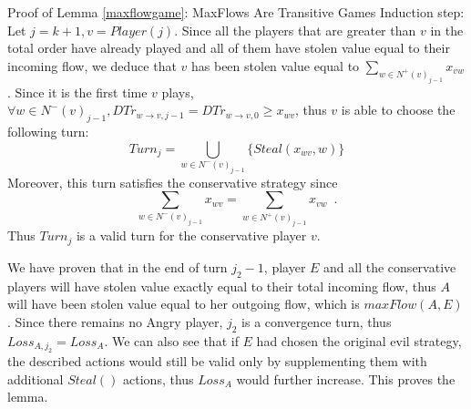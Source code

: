 \begin{sepproof}{Proof of Lemma \ref{maxflowgame}: MaxFlows Are Transitive Games}
  Induction step: Let $j = k + 1, v = Player\left(j\right)$. Since all the players that are greater than $v$ in the
  total order have already played and all of them have stolen value equal to their incoming flow, we deduce that $v$ has
  been stolen value equal to $\sum\limits_{w \in N^{+}\left(v\right)_{j-1}}x_{vw}$. Since it is the first time $v$
  plays, $\forall w \in N^{-}\left(v\right)_{j-1}, DTr_{w \rightarrow v, j-1} = DTr_{w \rightarrow v, 0} \geq x_{wv}$, thus
  $v$ is able to choose the following turn:
  \begin{equation*}
    Turn_j = \bigcup\limits_{w \in N^{-}\left(v\right)_{j-1}}\{Steal\left(x_{wv}, w\right)\}
  \end{equation*}
  Moreover, this turn satisfies the conservative strategy since
  \begin{equation*}
    \sum\limits_{w \in N^{-}\left(v\right)_{j-1}}x_{wv} = \sum\limits_{w \in N^{+}\left(v\right)_{j-1}}x_{vw} \enspace.
  \end{equation*}
  Thus $Turn_j$ is a valid turn for the conservative player $v$.

  We have proven that in the end of turn $j_2 - 1$, player $E$ and all the conservative players will have stolen value
  exactly equal to their total incoming flow, thus $A$ will have been stolen value equal to her outgoing flow, which is
  $maxFlow(A, E)$. Since there remains no Angry player, $j_2$ is a convergence turn, thus $Loss_{A, j_2} = Loss_A$. We
  can also see that if $E$ had chosen the original evil strategy, the described actions would still be valid only by
  supplementing them with additional $Steal\left(\right)$ actions, thus $Loss_A$ would further increase. This proves the
  lemma.
\end{sepproof}
